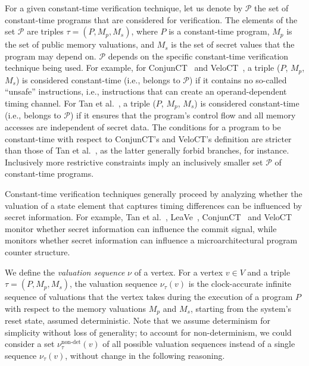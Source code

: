 For a given constant-time verification technique, let us denote by $\mathcal{P}$ the set of constant-time programs that are considered for verification.
The elements of the set $\mathcal{P}$ are triples $\tau = (P, M_p, M_s)$, where $P$ is a constant-time program, $M_p$ is the set of public memory valuations, and $M_s$ is the set of secret values that the program may depend on.
$\mathcal{P}$ depends on the specific constant-time verification technique being used.
For example, for ConjunCT~\cite{dinesh2024conjunct} and VeloCT~\cite{dinesh2025h}, a triple ($P$, $M_p$, $M_s$) is considered constant-time (i.e., belongs to $\mathcal{P}$) if it contains no so-called ``unsafe'' instructions, i.e., instructions that can create an operand-dependent timing channel.
For Tan et al.~\cite{tan2025contractshadowlogic}, a triple ($P$, $M_p$, $M_s$) is considered constant-time (i.e., belongs to $\mathcal{P}$) if it ensures that the program's control flow and all memory accesses are independent of secret data.
The conditions for a program to be constant-time with respect to ConjunCT's and VeloCT's definition are stricter than those of Tan et al.~\cite{tan2025contractshadowlogic}, as the latter generally forbid branches, for instance.
Inclusively more restrictive constraints imply an inclusively smaller set $\mathcal{P}$ of constant-time programs.

Constant-time verification techniques generally proceed by analyzing whether the valuation of a state element that captures timing differences can be influenced by secret information.
For example, Tan et al.~\cite{tan2025contractshadowlogic}, LeaVe~\cite{wang2023specification}, ConjunCT~\cite{dinesh2024conjunct} and VeloCT~\cite{dinesh2025h} monitor whether secret information can influence the commit signal, while \ucfi~\cite{ceesay2024mucfi} monitors whether secret information can influence a microarchitectural program counter structure.

We define the \emph{valuation sequence} $\nu$ of a vertex.
For a vertex $v \in V$ and a triple $\tau = (P, M_p, M_s)$, the valuation sequence $\nu_\tau(v)$ is the clock-accurate infinite sequence of valuations that the vertex takes during the execution of a program $P$ with respect to the memory valuations $M_p$ and $M_s$, starting from the system's reset state, assumed deterministic.
Note that we assume determinism for simplicity without loss of generality; to account for non-determinism, we could consider a set $\nu_\tau^{\text{non-det}}(v)$ of all possible valuation sequences instead of a single sequence $\nu_\tau(v)$, without change in the following reasoning.

